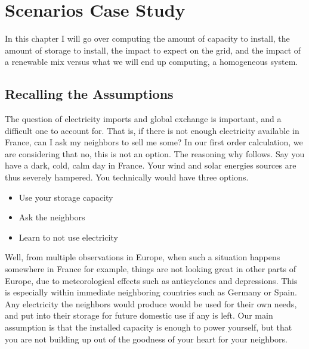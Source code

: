\setchapterpreamble[u]{\margintoc}
\chapter{Scenarios Case Study}

In this chapter I will go over computing the amount of capacity to install, the amount of storage to install, the impact to expect on the grid, and the impact of a renewable mix versus what we will end up computing, a homogeneous system.



\section{Recalling the Assumptions}

The question of electricity imports and global exchange is important, and a difficult one to account for. That is, if there is not enough electricity available in France, can I ask my neighbors to sell me some? In our first order calculation, we are considering that no, this is not an option. The reasoning why follows. Say you have a dark, cold, calm day in France. Your wind and solar energies sources are thus severely hampered. You technically would have three options.

\begin{itemize}
	\item Use your storage capacity
	\item Ask the neighbors
	\item Learn to not use electricity
\end{itemize}


Well, from multiple observations in Europe, when such a situation happens somewhere in France for example, things are not looking great in other parts of Europe, due to meteorological effects such as anticyclones and depressions. This is especially within immediate neighboring countries such as Germany or Spain. Any electricity the neighbors would produce would be used for their own needs, and put into their storage for future domestic use if any is left. Our main assumption is that the installed capacity is enough to power yourself, but that you are not building up out of the goodness of your heart for your neighbors.

